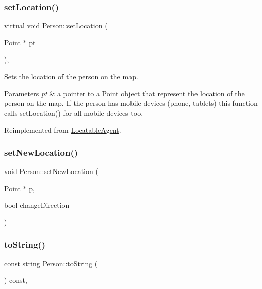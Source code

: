 \subsubsection{\texorpdfstring{setLocation()}{setLocation()}}
{\footnotesize\ttfamily virtual void Person\+::set\+Location (\begin{DoxyParamCaption}\item[{Point $\ast$}]{pt }\end{DoxyParamCaption})\hspace{0.3cm}{\ttfamily [override]}, {\ttfamily [virtual]}}

Sets the location of the person on the map. 
\begin{DoxyParams}{Parameters}
{\em pt} & a pointer to a Point object that represent the location of the person on the map. If the person has mobile devices (phone, tablets) this function calls \mbox{\hyperlink{class_person_a05f4ac2107d59e03f0f336eda08aa358}{set\+Location()}} for all mobile devices too. \\
\hline
\end{DoxyParams}


Reimplemented from \mbox{\hyperlink{class_locatable_agent_a754b237c404b77714fedd397f214bc02}{Locatable\+Agent}}.

\mbox{\label{class_person_a69c7c176dcafd2023b9f43b26cd6de06}} 
\subsubsection{\texorpdfstring{setNewLocation()}{setNewLocation()}}
{\footnotesize\ttfamily void Person\+::set\+New\+Location (\begin{DoxyParamCaption}\item[{Point $\ast$}]{p,  }\item[{bool}]{change\+Direction }\end{DoxyParamCaption})\hspace{0.3cm}{\ttfamily [private]}}

\mbox{\label{class_person_a68872538da519d0a04297f43376db27c}} 
\subsubsection{\texorpdfstring{toString()}{toString()}}
{\footnotesize\ttfamily const string Person\+::to\+String (\begin{DoxyParamCaption}{ }\end{DoxyParamCaption}) const\hspace{0.3cm}{\ttfamily [override]}, {\ttfamily [virtual]}}

